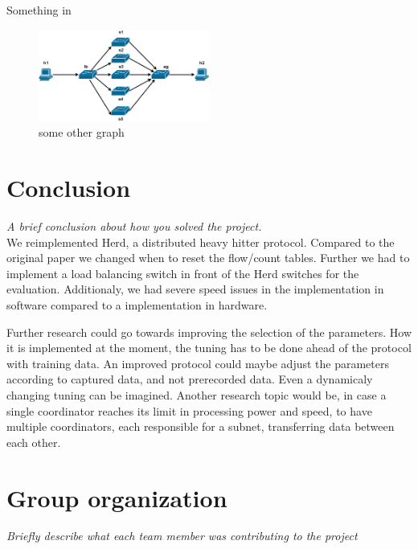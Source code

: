 \documentclass[11pt,oneside,a4paper]{article}
\newcommand{\hint}[1]{{\color{blue} \em #1}}
\begin{document}
\lipsum[1]
Something in %

\begin{figure}
	\centering
	\includegraphics[width=0.5\textwidth]{figures/Herd_topology}
	\caption{some other graph}
	\label{fig:topology_fig}
\end{figure}

\section{Conclusion}
\hint{A brief conclusion about how you solved the project.} \\
We reimplemented Herd, a distributed heavy hitter protocol. Compared to the original paper we changed when to reset the flow/count tables. Further we had to implement a load balancing switch in front of the Herd switches for the evaluation. Additionaly, we had severe speed issues in the implementation in software compared to a implementation in hardware.

Further research could go towards improving the selection of the parameters. How it is implemented at the moment, the tuning has to be done ahead of the protocol with training data. An improved protocol could maybe adjust the parameters according to captured data, and not prerecorded data. Even a dynamicaly changing tuning can be imagined. Another research topic would be, in case a single coordinator reaches its limit in processing power and speed, to have multiple coordinators, each responsible for a subnet, transferring data between each other.

\label{lastpage} %
\clearpage
{}



\clearpage
\appendix
{}

\section{Group organization}
\hint{Briefly describe what each team member was contributing to the project}%
\end{document}

